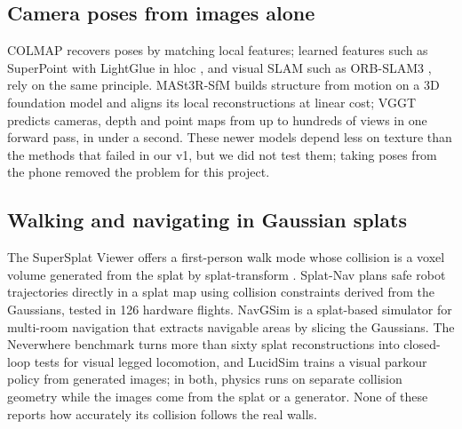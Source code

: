 \subsection{Camera poses from images alone}
COLMAP \cite{schoenberger2016colmap} recovers poses by matching local features; learned features such as SuperPoint \cite{detone2018superpoint} with LightGlue \cite{lindenberger2023lightglue} in hloc \cite{sarlin2019hloc}, and visual SLAM such as ORB-SLAM3 \cite{campos2021orbslam3}, rely on the same principle. MASt3R-SfM \cite{duisterhof2025mast3rsfm} builds structure from motion on a 3D foundation model and aligns its local reconstructions at linear cost; VGGT \cite{wang2025vggt} predicts cameras, depth and point maps from up to hundreds of views in one forward pass, in under a second. These newer models depend less on texture than the methods that failed in our v1, but we did not test them; taking poses from the phone removed the problem for this project.

\subsection{Walking and navigating in Gaussian splats}
The SuperSplat Viewer \cite{supersplatviewer} offers a first-person walk mode whose collision is a voxel volume generated from the splat by splat-transform \cite{splattransform, supersplatwalk}. Splat-Nav \cite{chen2025splatnav} plans safe robot trajectories directly in a splat map using collision constraints derived from the Gaussians, tested in 126 hardware flights. NavGSim \cite{liu2026navgsim} is a splat-based simulator for multi-room navigation that extracts navigable areas by slicing the Gaussians. The Neverwhere benchmark \cite{chen2026neverwhere} turns more than sixty splat reconstructions into closed-loop tests for visual legged locomotion, and LucidSim \cite{yu2024lucidsim} trains a visual parkour policy from generated images; in both, physics runs on separate collision geometry while the images come from the splat or a generator. None of these reports how accurately its collision follows the real walls.

